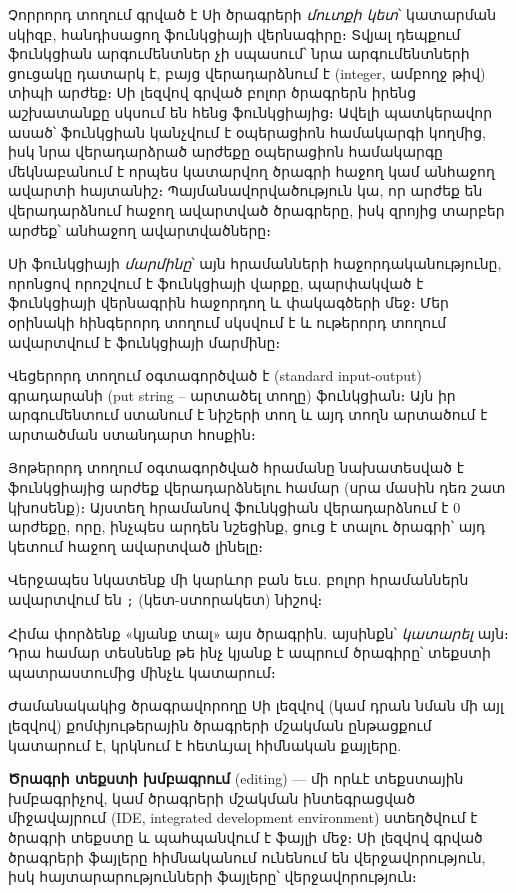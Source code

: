 Չորրորդ տողում գրված է Սի ծրագրերի \emph{մուտքի կետ}՝ կատարման
սկիզբ, հանդիսացող  ֆունկցիայի վերնագիրը։
Տվյալ դեպքում  ֆունկցիան արգումենտներ չի սպասում՝ նրա
արգումենտների ցուցակը դատարկ է, բայց վերադարձնում է 
(integer, ամբողջ թիվ) տիպի արժեք։ Սի լեզվով գրված բոլոր ծրագրերն
իրենց աշխատանքը սկսում են հենց  ֆունկցիայից։ Ավելի
պատկերավոր ասած՝  ֆունկցիան կանչվում է օպերացիոն
համակարգի կողմից, իսկ նրա վերադարձրած արժեքը օպերացիոն համակարգը
մեկնաբանում է որպես կատարվող ծրագրի հաջող կամ անհաջող ավարտի
հայտանիշ։ Պայմանավորվածություն կա, որ  արժեք են
վերադարձնում հաջող ավարտված ծրագրերը, իսկ զրոյից տարբեր արժեք՝
անհաջող ավարտվածները։

Սի ֆունկցիայի \emph{մարմինը}՝ այն հրամանների հաջորդականությունը,
որոնցով որոշվում է ֆունկցիայի վարքը, պարփակված է ֆունկցիայի
վերնագրին հաջորդող \code{\{} և \code{\}} փակագծերի մեջ։ Մեր
օրինակի հինգերորդ տողում սկսվում է և ութերորդ տողում ավարտվում 
է  ֆունկցիայի մարմինը։

Վեցերորդ տողում օգտագործված է  (standard 
input-output) գրադարանի  (put string 
-- արտածել տողը) ֆունկցիան։ Այն իր արգումենտում ստանում է 
նիշերի տող և այդ տողն արտածում է  արտածման 
ստանդարտ հոսքին։

Յոթերորդ տողում օգտագործված  հրամանը
նախատեսված է ֆունկցիայից արժեք վերադարձնելու համար (սրա մասին
դեռ շատ կխոսենք)։ Այստեղ  հրամանով  
ֆունկցիան վերադարձնում է \(0\) արժեքը, որը, ինչպես արդեն նշեցինք, 
ցուց է տալու ծրագրի՝ այդ կետում հաջող ավարտված լինելը։

Վերջապես նկատենք մի կարևոր բան եւս. բոլոր հրամաններն ավարտվում
են \verb|;| (կետ-ստորակետ) նիշով։

\smallskip
Հիմա փորձենք «կյանք տալ» այս ծրագրին. այսինքն՝ \emph{կատարել} այն։
Դրա համար տեսնենք թե ինչ կյանք է ապրում ծրագիրը՝ տեքստի պատրաստումից
մինչև կատարում։

Ժամանակակից ծրագրավորողը Սի լեզվով (կամ դրան նման մի այլ լեզվով) 
քոմփյութերային ծրագրերի մշակման ընթացքում կատարում է, կրկնում է 
հետևյալ հիմնական քայլերը.

\noindent\textbf{Ծրագրի տեքստի խմբագրում} (editing) --- մի որևէ տեքստային
խմբագրիչով, կամ ծրագրերի մշակման ինտեգրացված միջավայրում (IDE,
integrated development environment) ստեղծվում է ծրագրի տեքստը և
պահպանվում է ֆայլի մեջ։ Սի լեզվով գրված ծրագրերի ֆայլերը հիմնականում
ունենում են  վերջավորություն, իսկ հայտարարությունների 
ֆայլերը՝  վերջավորություն։

